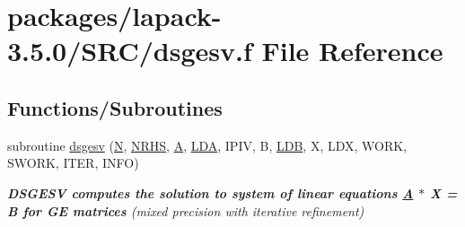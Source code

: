 \hypertarget{dsgesv_8f}{}\section{packages/lapack-\/3.5.0/\+S\+R\+C/dsgesv.f File Reference}
\label{dsgesv_8f}
\subsection*{Functions/\+Subroutines}
\begin{DoxyCompactItemize}
\item 
subroutine \hyperlink{group__doubleGEsolve_ga05bea3dc0386868e4720f22c969cb9f5}{dsgesv} (\hyperlink{polmisc_8c_a0240ac851181b84ac374872dc5434ee4}{N}, \hyperlink{example__user_8c_aa0138da002ce2a90360df2f521eb3198}{N\+R\+H\+S}, \hyperlink{classA}{A}, \hyperlink{example__user_8c_ae946da542ce0db94dced19b2ecefd1aa}{L\+D\+A}, I\+P\+I\+V, B, \hyperlink{example__user_8c_a50e90a7104df172b5a89a06c47fcca04}{L\+D\+B}, X, L\+D\+X, W\+O\+R\+K, S\+W\+O\+R\+K, I\+T\+E\+R, I\+N\+F\+O)
\begin{DoxyCompactList}\small\item\em {\bfseries  D\+S\+G\+E\+S\+V computes the solution to system of linear equations \hyperlink{classA}{A} $\ast$ X = B for G\+E matrices} (mixed precision with iterative refinement) \end{DoxyCompactList}\end{DoxyCompactItemize}
